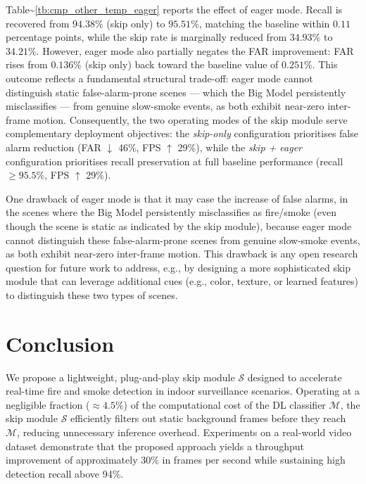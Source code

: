 \documentclass[
  10pt,
]{article}
\begin{document}
Table\textasciitilde{}\ref{tb:cmp_other_temp_eager} reports the effect
of eager mode. Recall is recovered from \(94.38\%\) (skip only) to
\(95.51\%\), matching the baseline within \(0.11\) percentage points,
while the skip rate is marginally reduced from \(34.93\%\) to
\(34.21\%\). However, eager mode also partially negates the FAR
improvement: FAR rises from \(0.136\%\) (skip only) back toward the
baseline value of \(0.251\%\). This outcome reflects a fundamental
structural trade-off: eager mode cannot distinguish static
false-alarm-prone scenes --- which the Big Model persistently
misclassifies --- from genuine slow-smoke events, as both exhibit
near-zero inter-frame motion. Consequently, the two operating modes of
the skip module serve complementary deployment objectives: the
\emph{skip-only} configuration prioritises false alarm reduction (FAR
\(\downarrow\) 46\%, FPS \(\uparrow\) 29\%), while the
\emph{skip + eager} configuration prioritises recall preservation at
full baseline performance (recall \(\geq 95.5\%\), FPS \(\uparrow\)
29\%).



One drawback of eager mode is that it may case the increase of false
alarms, in the scenes where the Big Model persistently misclassifies as
fire/smoke (even though the scene is static as indicated by the skip
module), because eager mode cannot distinguish these false-alarm-prone
scenes from genuine slow-smoke events, as both exhibit near-zero
inter-frame motion. This drawback is any open research question for
future work to address, e.g., by designing a more sophisticated skip
module that can leverage additional cues (e.g., color, texture, or
learned features) to distinguish these two types of scenes.

\section{Conclusion}\label{sec:conclusion}

We propose a lightweight, plug-and-play skip module \(\mathcal{S}\)
designed to accelerate real-time fire and smoke detection in indoor
surveillance scenarios. Operating at a negligible fraction
(\({\approx}4.5\%\)) of the computational cost of the DL classifier
\(\mathcal{M}\), the skip module \(\mathcal{S}\) efficiently filters out
static background frames before they reach \(\mathcal{M}\), reducing
unnecessary inference overhead. Experiments on a real-world video
dataset demonstrate that the proposed approach yields a throughput
improvement of approximately 30\% in frames per second while sustaining
high detection recall above 94\%.
\end{document}
